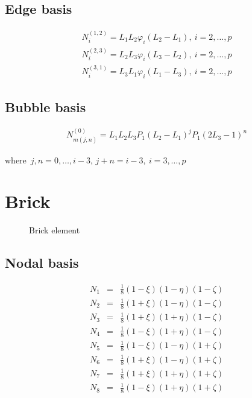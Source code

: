 \subsection{Edge basis}

\begin{eqnarray*}
N_i^{(1,2)}=L_1L_2\varphi_i(L_2-L_1),\ i=2,\ldots,p \\
N_i^{(2,3)}=L_2L_3\varphi_i(L_3-L_2),\ i=2,\ldots,p \\
N_i^{(3,1)}=L_3L_1\varphi_i(L_1-L_3),\ i=2,\ldots,p
\end{eqnarray*}

\subsection{Bubble basis}

\begin{eqnarray*}
N_{m(j,n)}^{(0)}=L_1L_2L_3 P_{1}(L_2-L_1)^{j}P_{1}(2L_3-1)^{n}
\end{eqnarray*}

\noindent where\ $j,n=0,\ldots,i-3$, $j+n=i-3,\ i=3,\ldots,p$

\section{Brick}

\begin{figure}[tbhp]
\begin{center}

\caption{Brick element}
\end{center}
\end{figure}

\subsection{Nodal basis}

\begin{eqnarray*}
N_1&=&\frac{1}{8}(1-\xi)(1-\eta)(1-\zeta) \\
N_2&=&\frac{1}{8}(1+\xi)(1-\eta)(1-\zeta) \\
N_3&=&\frac{1}{8}(1+\xi)(1+\eta)(1-\zeta) \\
N_4&=&\frac{1}{8}(1-\xi)(1+\eta)(1-\zeta) \\
N_5&=&\frac{1}{8}(1-\xi)(1-\eta)(1+\zeta) \\
N_6&=&\frac{1}{8}(1+\xi)(1-\eta)(1+\zeta) \\
N_7&=&\frac{1}{8}(1+\xi)(1+\eta)(1+\zeta) \\
N_8&=&\frac{1}{8}(1-\xi)(1+\eta)(1+\zeta)
\end{eqnarray*}

